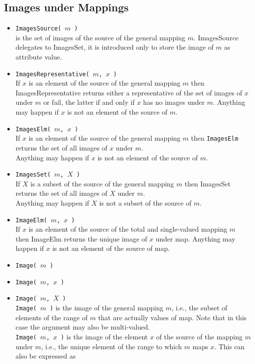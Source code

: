 \subsection{Images under Mappings}
\begin{itemize}
\item {\tt ImagesSource( $m$ )}\\
is the set of images of the source of the general mapping $m$.
ImagesSource delegates to ImagesSet, it is introduced only to store the image of $m$ as attribute value.
\item {\tt ImagesRepresentative( $m$, $x$ )}\\
If $x$ is an element of the source of the general mapping $m$ then ImagesRepresentative returns either
a representative of the set of images of $x$ under $m$ or fail, the latter if and only if $x$ has no images
under $m$.
Anything may happen if $x$ is not an element of the source of $m$.
\item {\tt ImagesElm( $m$, $x$ )}\\
If $x$ is an element of the source of the general mapping $m$ then {\tt ImagesElm} returns the set of all images
of $x$ under $m$.
\\[4pt]
Anything may happen if $x$ is not an element of the source of $m$.
\item {\tt ImagesSet( $m$, $X$ )}\\
If $X$ is a subset of the source of the general mapping $m$ then ImagesSet returns the set of all images
of $X$ under $m$.
\\[4pt]
Anything may happen if $X$ is not a subset of the source of $m$.
\item {\tt ImageElm( $m$, $x$ )}\\
If $x$ is an element of the source of the total and single-valued mapping $m$ then ImageElm returns the
unique image of $x$ under map.
Anything may happen if $x$ is not an element of the source of map.
\item {\tt Image( $m$ )}
\item {\tt Image( $m$, $x$ )}
\item {\tt Image( $m$, $X$ )}\\
{\tt Image( $m$ )} is the image of the general mapping $m$, i.e., the subset of
elements of the range of $m$ that are actually values of map. 
Note that in this case the argument may also be multi-valued.
\\[4pt]
{\tt Image( $m$, $x$ )} is the image of the element $x$ of the source of the mapping $m$ under $m$, i.e., the
unique element of the range to which $m$ maps $x$. This can also be expressed as \\

\end{itemize}
